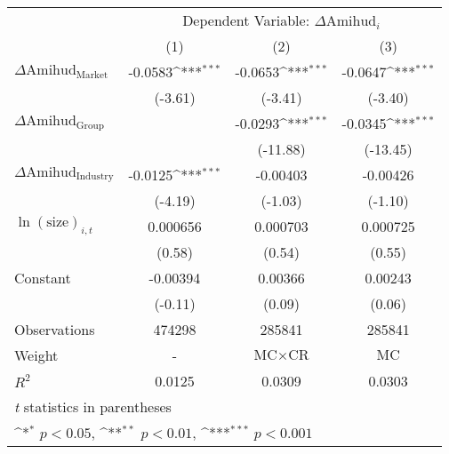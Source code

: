 {
\def\sym#1{\ifmmode^{#1}\else\(^{#1}\)\fi}
\begin{tabular}{l*{3}{c}}
\hline\hline
                    &\multicolumn{3}{c}{Dependent Variable: $\Delta \text{Amihud}_{i} $ }\\\cmidrule(lr){2-4}
                    &\multicolumn{1}{c}{(1)}         &\multicolumn{1}{c}{(2)}         &\multicolumn{1}{c}{(3)}         \\
\hline
 $ \Delta \text{Amihud}_{\text{Market}} $ &     -0.0583\sym{***}&     -0.0653\sym{***}&     -0.0647\sym{***}\\
                    &     (-3.61)         &     (-3.41)         &     (-3.40)         \\
[1em]
 $ \Delta \text{Amihud}_{\text{Group}} $ &                     &     -0.0293\sym{***}&     -0.0345\sym{***}\\
                    &                     &    (-11.88)         &    (-13.45)         \\
[1em]
 $ \Delta \text{Amihud}_{\text{Industry}} $ &     -0.0125\sym{***}&    -0.00403         &    -0.00426         \\
                    &     (-4.19)         &     (-1.03)         &     (-1.10)         \\
[1em]
 $ \ln(\text{size})_{i,t} $ &    0.000656         &    0.000703         &    0.000725         \\
                    &      (0.58)         &      (0.54)         &      (0.55)         \\
[1em]
Constant            &    -0.00394         &     0.00366         &     0.00243         \\
                    &     (-0.11)         &      (0.09)         &      (0.06)         \\
\hline
Observations        &      474298         &      285841         &      285841         \\
Weight              &           -         & $ \text{MC} \times \text{CR} $          & $ \text{MC} $          \\
$ R^2 $             &      0.0125         &      0.0309         &      0.0303         \\
\hline\hline
\multicolumn{4}{l}{\footnotesize \textit{t} statistics in parentheses}\\
\multicolumn{4}{l}{\footnotesize \sym{*} \(p<0.05\), \sym{**} \(p<0.01\), \sym{***} \(p<0.001\)}\\
\end{tabular}
}
